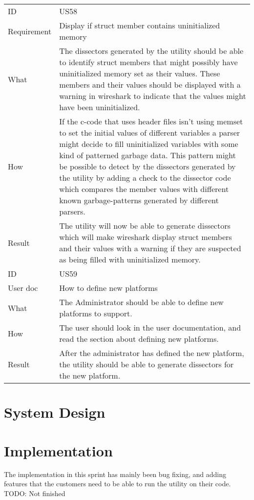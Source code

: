 \begin{table}[htbp]
{\begin{tabularx}{1.2\textwidth}{l X}
	\midrule
	ID & US58 \\
	Requirement & Display if \gls{struct} \gls{member} contains uninitialized memory \\
	What & The \glspl{dissector} generated by the \gls{utility} should be able to identify \gls{struct} \glspl{member} that might possibly have uninitialized memory set as their values.
 	These \glspl{member} and their values should be displayed with a warning in \Gls{wireshark} to indicate that the values might have been uninitialized.  \\
	How & If the \Gls{c}-code that uses \gls{header} files isn’t using memset to set the initial values of different variables a \gls{parser} might decide to fill uninitialized variables with some kind of patterned garbage data.
 	This pattern might be possible to detect by the \glspl{dissector} generated by the \gls{utility} by adding a check to the \gls{dissector} code which compares the \gls{member} values with different known garbage-patterns generated by different \glspl{parser}. \\
	Result & The \gls{utility} will now be able to generate \glspl{dissector} which will make \Gls{wireshark} display \gls{struct} \glspl{member} and their values with a warning if they are suspected as being filled with uninitialized memory. \\	
	\midrule
	ID & US59 \\
	User doc & How to define new platforms \\
	What & The Administrator should be able to define new platforms to support.  \\
	How & The user should look in the user documentation, and read the section about defining new platforms. \\
	Result & After the administrator has defined the new platform, the \gls{utility} should be able to generate \glspl{dissector} for the new platform. \\	
	\bottomrule
\end{tabularx}}
\end{table}

\section{System Design}


\section{Implementation}
The implementation in this sprint has mainly been bug fixing, and adding 
features that the customers need to be able to run the utility on their code.
TODO: Not finished

